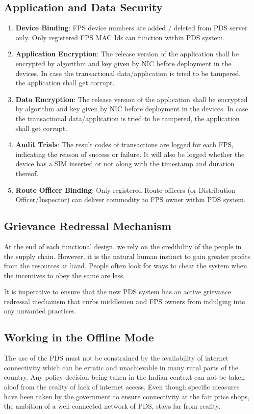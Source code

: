 \documentclass[a4paper,12pt]{extarticle}
\begin{document}
\subsection{Application and Data Security}

\begin{enumerate}
\item \textbf{Device Binding}: FPS device numbers are added / deleted from PDS server only. Only registered FPS MAC Ids can function within PDS system.
\item \textbf{Application Encryption}: The release version of the application shall be encrypted by algorithm and key given by NIC before deployment in the devices. In case the transactional data/application is tried to be tampered, the application shall get corrupt.
\item \textbf{Data Encryption}: The release version of the application shall be encrypted by algorithm and key given by NIC before deployment in the devices. In case the transactional data/application is tried to be tampered, the application shall get corrupt.
\item \textbf{Audit Trials}: The result codes of transactions are logged for each FPS, indicating the reason of success or failure. It will also be logged whether the device has a SIM inserted or not along with the timestamp and duration thereof.
\item \textbf{Route Officer Binding}: Only registered Route officers (or Distribution Officer/Inspector) can deliver commodity to FPS owner within PDS system.
\end{enumerate}

\subsection{Grievance Redressal Mechanism}
At the end of each functional design, we rely on the credibility of the people in the supply chain. However, it is the natural human instinct to gain greater profits from the resources at hand. People often look for ways to cheat the system when the incentives to obey the same are less.

It is imperative to ensure that the new PDS system has an active grievance redressal mechanism that curbs middlemen and FPS owners from indulging into any unwanted practices.

\subsection{Working in the Offline Mode}
The use of the PDS must not be constrained by the availability of internet connectivity which can be erratic and unachievable in many rural parts of the country. Any policy decision being taken in the Indian context can not be taken aloof from the reality of lack of internet access.  Even though specific measures have been taken by the government to ensure connectivity at the fair price shops, the ambition of a well connected network of PDS, stays far from reality.
\end{document}
